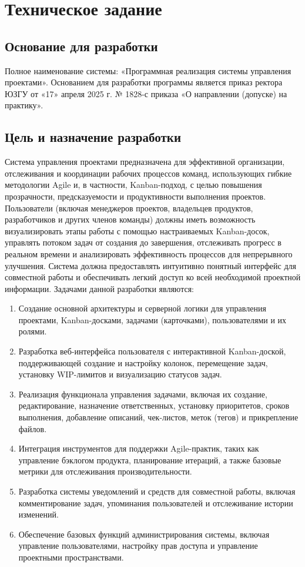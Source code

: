 \section{Техническое задание}
\subsection{Основание для разработки}

Полное наименование системы: «Программная реализация системы управления проектами». Основанием для разработки программы является приказ ректора ЮЗГУ от «17» апреля 2025 г. № 1828-с приказа «О направлении (допуске) на практику». %

\subsection{Цель и назначение разработки}

Система управления проектами предназначена для эффективной организации, отслеживания и координации рабочих процессов команд, использующих гибкие методологии Agile и, в частности, Kanban-подход, с целью повышения прозрачности, предсказуемости и продуктивности выполнения проектов.
Пользователи (включая менеджеров проектов, владельцев продуктов, разработчиков и других членов команды) должны иметь возможность визуализировать этапы работы с помощью настраиваемых Kanban-досок, управлять потоком задач от создания до завершения, отслеживать прогресс в реальном времени и анализировать эффективность процессов для непрерывного улучшения. Система должна предоставлять интуитивно понятный интерфейс для совместной работы и обеспечивать легкий доступ ко всей необходимой проектной информации.
Задачами данной разработки являются:
\begin{enumerate}
	\item Создание основной архитектуры и серверной логики для управления проектами, Kanban-досками, задачами (карточками), пользователями и их ролями.
	\item Разработка веб-интерфейса пользователя с интерактивной Kanban-доской, поддерживающей создание и настройку колонок, перемещение задач, установку WIP-лимитов и визуализацию статусов задач.
	\item Реализация функционала управления задачами, включая их создание, редактирование, назначение ответственных, установку приоритетов, сроков выполнения, добавление описаний, чек-листов, меток (тегов) и прикрепление файлов.
	\item Интеграция инструментов для поддержки Agile-практик, таких как управление бэклогом продукта, планирование итераций, а также базовые метрики для отслеживания производительности.
	\item Разработка системы уведомлений и средств для совместной работы, включая комментирование задач, упоминания пользователей и отслеживание истории изменений.
	\item Обеспечение базовых функций администрирования системы, включая управление пользователями, настройку прав доступа и управление проектными пространствами.
\end{enumerate}


